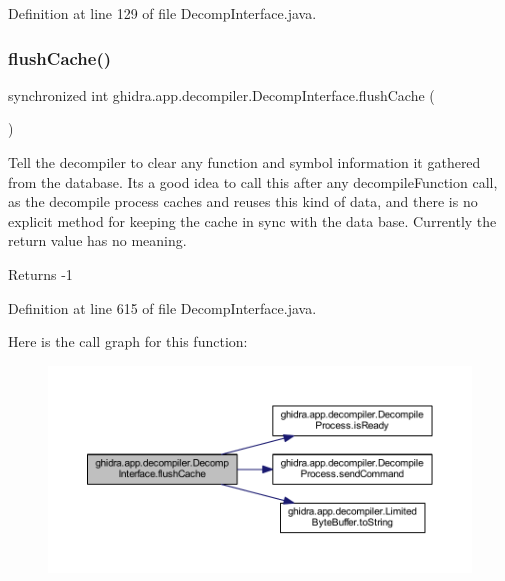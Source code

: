 Definition at line 129 of file Decomp\+Interface.\+java.

\mbox{\label{classghidra_1_1app_1_1decompiler_1_1_decomp_interface_abc7f4380b716927ca1199f41af1307c9}} 
\subsubsection{\texorpdfstring{flushCache()}{flushCache()}}
{\footnotesize\ttfamily synchronized int ghidra.\+app.\+decompiler.\+Decomp\+Interface.\+flush\+Cache (\begin{DoxyParamCaption}{ }\end{DoxyParamCaption})\hspace{0.3cm}{\ttfamily [inline]}}

Tell the decompiler to clear any function and symbol information it gathered from the database. Its a good idea to call this after any decompile\+Function call, as the decompile process caches and reuses this kind of data, and there is no explicit method for keeping the cache in sync with the data base. Currently the return value has no meaning. \begin{DoxyReturn}{Returns}
-\/1 
\end{DoxyReturn}


Definition at line 615 of file Decomp\+Interface.\+java.

Here is the call graph for this function\+:
\nopagebreak
\begin{figure}[H]
\begin{center}
\leavevmode
\includegraphics[width=350pt]{classghidra_1_1app_1_1decompiler_1_1_decomp_interface_abc7f4380b716927ca1199f41af1307c9_cgraph}
\end{center}
\end{figure}
\mbox{\label{classghidra_1_1app_1_1decompiler_1_1_decomp_interface_ab7b5650e01b82f6c1c6f3cf23d3e758a}} 
